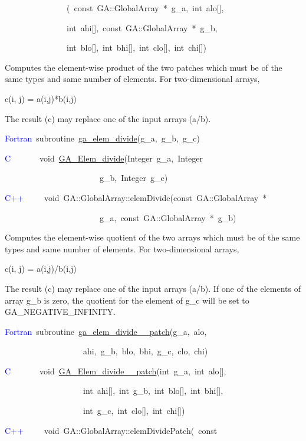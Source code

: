 ~~~~~~~~~~~~~~~(~const~GA::GlobalArray~{*}~g\_a,~int~alo{[}{]},~

~~~~~~~~~~~~~~~int~ahi{[}{]},~const~GA::GlobalArray~{*}~g\_b,~

~~~~~~~~~~~~~~~int~blo{[}{]},~int~bhi{[}{]},~int~clo{[}{]},~int~chi{[}{]})

Computes the element-wise product of the two patches which must be
of the same types and same number of elements. For two-dimensional
arrays,

c(i, j) = a(i,j){*}b(i,j)

The result (c) may replace one of the input arrays (a/b).

\textcolor{blue}{Fortran}~subroutine~\href{https://hpc.pnl.gov/globalarrays/api/f_op_api.html\#ga_elem_divide}{ga\_{}elem\_{}divide}(g\_a,~g\_b,~g\_c)~

\textcolor{blue}{C}~~~~~~~void~\href{https://hpc.pnl.gov/globalarrays/api/c_op_api.html\#ga_elem_divide}{GA\_{}Elem\_{}divide}(Integer~g\_a,~Integer~

~~~~~~~~~~~~~~~~~~~~~~~g\_b,~Integer~g\_c)

\textcolor{blue}{C++}~~~~~void~GA::GlobalArray::elemDivide(const~GA::GlobalArray~{*}~

~~~~~~~~~~~~~~~~~~~~~~~g\_a,~const~GA::GlobalArray~{*}~g\_b)

Computes the element-wise quotient of the two arrays which must be
of the same types and same number of elements. For two-dimensional
arrays,

c(i, j) = a(i,j)/b(i,j)

The result (c) may replace one of the input arrays (a/b). If one of
the elements of array g\_b is zero, the quotient for the element of
g\_c will be set to GA\_NEGATIVE\_INFINITY. 

\textcolor{blue}{Fortran}~subroutine~\href{https://hpc.pnl.gov/globalarrays/api/f_op_api.html\#ga_elem_divide_patch}{ga\_{}elem\_{}divide\_{}\_{}patch}(g\_a,~alo,~

~~~~~~~~~~~~~~~~~~~ahi,~g\_b,~blo,~bhi,~g\_c,~clo,~chi)~

\textcolor{blue}{C}~~~~~~~void~\href{https://hpc.pnl.gov/globalarrays/api/c_op_api.html\#ga_elem_divide_patch}{GA\_{}Elem\_{}divide\_{}\_{}patch}(int~g\_a,~int~alo{[}{]},

~~~~~~~~~~~~~~~~~~~int~ahi{[}{]},~int~g\_b,~int~blo{[}{]},~int~bhi{[}{]},~

~~~~~~~~~~~~~~~~~~~int~g\_c,~int~clo{[}{]},~int~chi{[}{]})~

\textcolor{blue}{C++}~~~~~void~GA::GlobalArray::elemDividePatch(~const~


